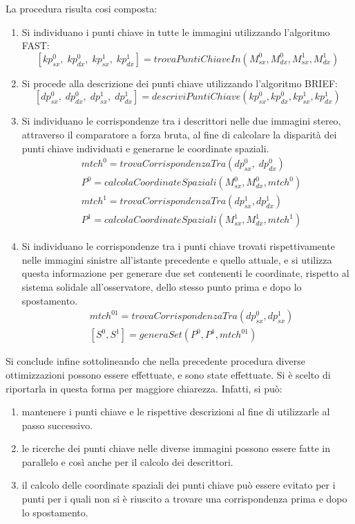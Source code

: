 La procedura risulta cosi composta:
\begin{enumerate}
	\item Si individuano i punti chiave in tutte le immagini utilizzando l'algoritmo FAST:
	\begin{equation}
		\nonumber [kp_{sx}^0, \; kp_{dx}^0, \; kp_{sx}^1, \; kp_{dx}^1] = trovaPuntiChiaveIn(M_{sx}^0, M_{dx}^0, M_{sx}^1, M_{dx}^1)
	\end{equation} 
	\item Si procede alla descrizione dei punti chiave utilizzando l'algoritmo BRIEF:
	\begin{equation}
		\nonumber [dp_{sx}^0, \; dp_{dx}^0, \; dp_{sx}^1, \; dp_{dx}^1] = descriviPuntiChiave(kp_{sx}^0, kp_{dx}^0, kp_{sx}^1, kp_{dx}^1)
	\end{equation}
	\item Si individuano le corrispondenze tra i descrittori nelle due immagini stereo, attraverso il comparatore a forza bruta, al fine di calcolare la disparità dei punti chiave individuati e generarne le coordinate spaziali.
	\begin{align}
		\nonumber &mtch^0 = trovaCorrispondenzaTra(dp_{sx}^0, \; dp_{dx}^0)\\
		\nonumber &P^0 = calcolaCoordinateSpaziali(M_{sx}^0, M_{dx}^0, mtch^0)\\
		\nonumber &mtch^1 = trovaCorrispondenzaTra(dp_{sx}^1, dp_{dx}^1)\\
		\nonumber &P^1 = calcolaCoordinateSpaziali(M_{sx}^1, M_{dx}^1, mtch^1)
	\end{align}
	\item Si individuano le corrispondenze tra i punti chiave trovati rispettivamente nelle immagini sinistre all'istante precedente e quello attuale, e si utilizza questa informazione per generare due set contenenti le coordinate, rispetto al sistema solidale all'osservatore, dello stesso punto prima e dopo lo spostamento.
	\begin{align}
		\nonumber &mtch^{01} = trovaCorrispondenzaTra(dp_{sx}^0, dp_{sx}^1)\\
		\nonumber &[S^0, S^1] = generaSet(P^0, P^1, mtch^{01})
	\end{align}
\end{enumerate}

Si conclude infine sottolineando che nella precedente procedura diverse ottimizzazioni possono essere effettuate, e sono state effettuate. Si è scelto di riportarla in questa forma per maggiore chiarezza. Infatti, si può:
\begin{enumerate}
	\item mantenere i punti chiave e le rispettive descrizioni al fine di utilizzarle al passo successivo.
	\item le ricerche dei punti chiave nelle diverse immagini possono essere fatte in parallelo e così anche per il calcolo dei descrittori.
	\item il calcolo delle coordinate spaziali dei punti chiave può essere evitato per i punti per i quali non si è riuscito a trovare una corrispondenza prima e dopo lo spostamento.
\end{enumerate}




